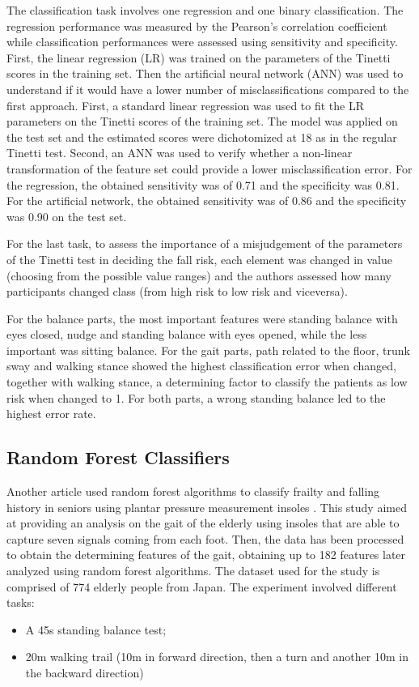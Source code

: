 The classification task involves one regression and one binary classification. The regression performance was measured by the Pearson's correlation coefficient while classification performances were assessed using sensitivity and specificity.
First, the linear regression (LR) was trained on the parameters of the Tinetti scores in the training set. Then the artificial neural network (ANN) was used to understand if it would have a lower number of misclassifications compared to the first approach. 
First, a standard linear regression was used to fit the LR parameters
on the Tinetti scores of the training set. The model was applied on the
test set and the estimated scores were dichotomized at 18 as in the
regular Tinetti test.
Second, an ANN was used to verify whether a non-linear transformation of the feature set could provide a lower misclassification error.
For the regression, the obtained sensitivity was of 0.71 and the specificity was 0.81.
For the artificial network, the obtained sensitivity was of 0.86 and the specificity was 0.90 on the test set.

For the last task, to assess the importance of a misjudgement of the parameters of the Tinetti test in deciding the fall risk, each element was changed in value (choosing from the possible value ranges) and the authors assessed how many participants changed class (from high risk to low risk and viceversa).  

For the balance parts, the most important features were standing balance
with eyes closed, nudge and standing balance with eyes opened, while the less important was sitting balance.
For the gait parts, path related to the floor, trunk sway and walking stance showed the highest classification error when changed, together with walking stance, a determining factor to classify the patients as low risk when changed to 1.
For both parts, a wrong standing balance led to the highest error rate.

\subsection{Random Forest Classifiers}
Another article used random forest algorithms to classify frailty and falling history in seniors using plantar pressure measurement insoles \cite{RandomForestInsoles}. This study aimed at providing an analysis on the gait of the elderly using insoles that are able to capture seven signals coming from each foot. Then, the data has been processed to obtain the determining features of the gait, obtaining up to 182 features later analyzed using random forest algorithms. 
The dataset used for the study is comprised of 774 elderly people from Japan. 
The experiment involved different tasks:
\begin{itemize}
    \item A 45s standing balance test;
    \item 20m walking trail (10m in forward direction, then a turn and another 10m in the backward direction)
\end{itemize}


